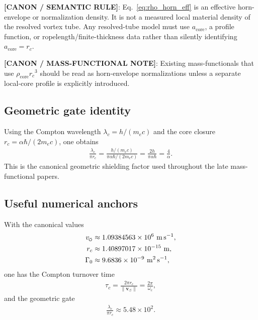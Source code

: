 \documentclass[11pt]{article}
\theoremstyle{definition}
\theoremstyle{plain}
\theoremstyle{remark}
\newcommand{\swirlarrow}{\mathchoice{\mkern-2mu\scriptstyle\boldsymbol{\circlearrowleft}}{\mkern-2mu\scriptstyle\boldsymbol{\circlearrowleft}}{\mkern-2mu\scriptscriptstyle\boldsymbol{\circlearrowleft}}{\mkern-2mu\scriptscriptstyle\boldsymbol{\circlearrowleft}}}
\newcommand{\rc}{{r_c}}
\newcommand{\vnorm}{\lVert \mathbf{v}_{\!\boldsymbol{\circlearrowleft}} \rVert}
\begin{document}
            \textbf{[CANON / SEMANTIC RULE]}: Eq.~\eqref{eq:rho_horn_eff} is an effective horn-envelope or normalization density. It is not a measured local material density of the resolved vortex tube. Any resolved-tube model must use $a_{\mathrm{core}}$, a profile function, or ropelength/finite-thickness data rather than silently identifying $a_{\mathrm{core}}=\rc$.

            \textbf{[CANON / MASS-FUNCTIONAL NOTE]}: Existing mass-functionals that use $\rho_{\mathrm{core}}\rc^3$ should be read as horn-envelope normalizations unless a separate local-core profile is explicitly introduced.

        \subsection{Geometric gate identity}
            Using the Compton wavelength $\lambda_c = h/(m_e c)$ and the core closure $r_c = \alpha\hbar/(2m_e c)$, one obtains
            \begin{align}
                \frac{\lambda_c}{\pi r_c}
                =
                \frac{h/(m_e c)}{\pi \alpha \hbar /(2m_e c)}
                =
                \frac{2h}{\pi \alpha \hbar}
                =
                \frac{4}{\alpha}.
            \end{align}
            This is the canonical geometric shielding factor used throughout the late mass-functional papers.

        \subsection{Useful numerical anchors}
            With the canonical values
            \begin{align}
                v_{\swirlarrow} &\approx 1.09384563\times 10^6\ \mathrm{m\,s^{-1}}, \\
                r_c &\approx 1.40897017\times 10^{-15}\ \mathrm{m}, \\
                \Gamma_0 &\approx 9.6836\times 10^{-9}\ \mathrm{m^2\,s^{-1}},
            \end{align}
            one has the Compton turnover time
            \begin{align}
                \tau_c = \frac{2\pi \rc}{\vnorm} = \frac{2\pi}{\omega_c},
            \end{align}
            and the geometric gate
            \begin{align}
                \frac{\lambda_c}{\pi \rc} \approx 5.48\times 10^2.
            \end{align}
\end{document}
